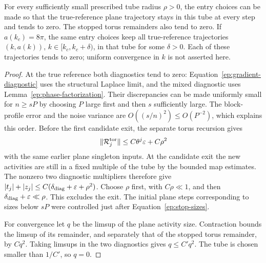 \begin{proposition}
\label{ep:no-exit}
For every sufficiently small prescribed tube radius $\rho>0$,
the entry choices can be made so that the true-reference plane
trajectory stays in this tube at every step and tends to zero.
The stopped torus remainders also tend to zero.  If
$a(k_c)=8\pi$, the same entry choices keep all true-reference
trajectories $(k,a(k))$, $k\in[k_c,k_c+\delta)$, in that tube for
some $\delta>0$.  Each of these trajectories tends to zero;
uniform convergence in $k$ is not asserted here.
\end{proposition}

\begin{proof}
At the true reference both diagnostics tend to zero:
Equation~\eqref{ep:gradient-diagnostic} uses the structural
Laplace limit, and the mixed diagnostic uses
Lemma~\ref{ep:phase-factorization}.  Their discrepancies can be
made uniformly small for $n\ge sP$ by choosing $P$ large first and then $s$ sufficiently
large.  The block-profile error and the noise variance are
$O((s/n)^2)\le O(P^{-2})$, which explains this order.  Before the first candidate exit, the separate torus
recursion gives
\[
 \|\mathcal R_j^{\rm tor}\|
 \le C\theta^j\varepsilon+C\rho^2
\]
with the same earlier plane singleton inputs.  At the candidate
exit the new activities are still in a fixed multiple of the
tube by the bounded map estimates.  The nonzero two diagnostic
multipliers therefore give
$|t_j|+|z_j|\le C(\delta_{\rm diag}+\varepsilon+\rho^2)$.
Choose $\rho$ first, with $C\rho\ll1$, and then
$\delta_{\rm diag}+\varepsilon\ll\rho$.  This excludes the exit.
The initial plane steps corresponding to sizes below $sP$ were
controlled just after Equation~\eqref{ep:stop-sizes}.

For convergence let $q$ be the limsup of the plane activity size.
Contraction bounds the limsup of its remainder, and separately
that of the stopped torus remainder, by $Cq^2$.  Taking limsups
in the two diagnostics gives $q\le C'q^2$.  The tube is chosen
smaller than $1/C'$, so $q=0$.


\end{proof}
